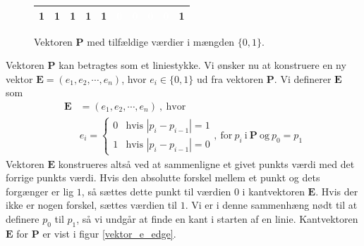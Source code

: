 {\begin{figure}[!h]
    \renewcommand{\arraystretch}{1.3}
    \centering
    \begin{tabular}{|c|c|c|c|c|c|c|c|c|c|}
        \hline
        1 & 1 & 1 & 1 & 1 & \cellcolor{black}\textcolor{white}{0} & \cellcolor{black}\textcolor{white}{0} & \cellcolor{black}\textcolor{white}{0} & \cellcolor{black}\textcolor{white}{0} & 1\\\hline
    \end{tabular}
    \caption[]{Vektoren $\mathbf{P}$ med tilfældige værdier i mængden
    $\{0,1\}$.}
    \label{vektor_p_edge}
\end{figure}
Vektoren $\mathbf{P}$ kan betragtes som et liniestykke. Vi ønsker nu at
konstruere en ny vektor $\mathbf{E} = (e_1, e_2, \cdots, e_n)$, hvor
$e_i \in \{0,1\}$ ud fra vektoren $\mathbf{P}$. Vi definerer
$\mathbf{E}$ som
\begin{equation}
    \begin{split}
        \mathbf{E} &= (e_1, e_2, \cdots, e_n) \mathrm{~,~hvor~} \\
        &e_i = \left\{
        \begin{array}{rl}
            0 & \text{hvis~} |p_i - p_{i - 1}| = 1\\
            1 & \text{hvis~} |p_i - p_{i - 1}| = 0
        \end{array} \right. \mathrm{,~for~} p_i \mathrm{~i~} \mathbf{P}
        \mathrm{~og~} p_0 = p_1
    \end{split}
    \label{vektor_e_bin}
\end{equation}
Vektoren $\mathbf{E}$ konstrueres altså ved at sammenligne et givet
punkts værdi med det forrige punkts værdi. Hvis den absolutte forskel
mellem et punkt og dets forgænger er lig $1$, så sættes dette punkt til
værdien $0$ i kantvektoren $\mathbf{E}$. Hvis der ikke er nogen forskel,
sættes værdien til $1$. Vi er i denne sammenhæng nødt til at definere
$p_0$ til $p_1$, så vi undgår at finde en kant i starten af en linie.
Kantvektoren $\mathbf{E}$ for $\mathbf{P}$ er vist i figur
\ref{vektor_e_edge}.

}
